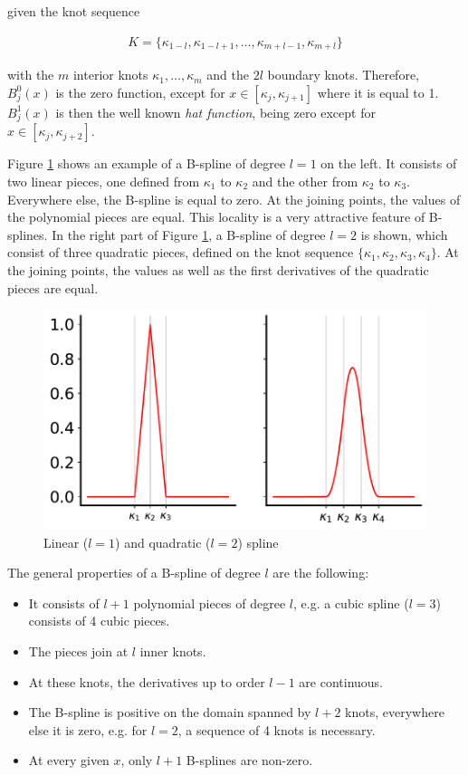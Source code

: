 \documentclass[10pt,a4paper]{report}
\begin{document}
given the knot sequence 

\begin{align}\label{eq:knot_sequence}
	K = \{\kappa_{1-l}, \kappa_{1-l+1}, \dots, \kappa_{m+l-1}, \kappa_{m+l}\}
\end{align}

with the $m$ interior knots $\kappa_1, \dots, \kappa_m$ and the $2l$ boundary knots. \cite{fahrmeir2013regression} Therefore, $B_j^0(x)$ is the zero function, except for $x \in [\kappa_j, \kappa_{j+1}]$ where it is equal to 1. $B_j^1(x)$ is then the well known \emph{hat function}, being zero except for $x \in [\kappa_j, \kappa_{j+2}]$. 

Figure \ref{fig:lin_and_quad_spline} shows an example of a B-spline of degree $l=1$ on the left. It consists of two linear pieces, one defined from $\kappa_1$ to $\kappa_2$ and the other from $\kappa_2$ to $\kappa_3$. Everywhere else, the B-spline is equal to zero. At the joining points, the values of the polynomial pieces are equal. This locality is a very attractive feature of B-splines. In the right part of Figure \ref{fig:lin_and_quad_spline}, a B-spline of degree $l=2$ is shown, which consist of three quadratic pieces, defined on the knot sequence $\{\kappa_1, \kappa_2, \kappa_3, \kappa_4\}$. At the joining points, the values as well as the first derivatives of the quadratic pieces are equal. 

\begin{figure}[H] 
	\centering
	\includegraphics[width=0.8\columnwidth]{../thesisplots/linear_and_quadratic_spline.pdf}
	\caption{Linear ($l=1$) and quadratic ($l=2$) spline}
	\label{fig:lin_and_quad_spline}
\end{figure}

The general properties of a B-spline of degree $l$ are the following:

\begin{itemize}
	\item It consists of $l+1$ polynomial pieces of degree $l$, e.g. a cubic spline ($l=3$) consists of 4 cubic pieces.
	\item The pieces join at $l$ inner knots.
	\item At these knots, the derivatives up to order $l-1$ are continuous.
	\item The B-spline is positive on the domain spanned by $l+2$ knots, everywhere else it is zero, e.g. for $l=2$, a sequence of 4 knots is necessary.
	\item At every given $x$, only $l+1$ B-splines are non-zero.
\end{itemize}
\end{document}
